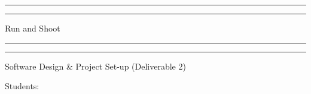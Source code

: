
 

\begin{titlepage} %

	\centering %
	
	\scshape %
	
	\vspace*{\baselineskip} %
	
	
	\rule{\textwidth}{1.6pt}\vspace*{-\baselineskip}\vspace*{2pt} %
	\rule{\textwidth}{0.4pt} %
	
	\vspace{0.75\baselineskip} %
	
	{\LARGE Run and Shoot} %
	
	\vspace{0.75\baselineskip} %
	
	\rule{\textwidth}{0.4pt}\vspace*{-\baselineskip}\vspace{3.2pt} %
	\rule{\textwidth}{1.6pt} %
	
	\vspace{2\baselineskip} %
	
	
	Software Design \& Project Set-up (Deliverable 2) %
	
	\vspace*{3\baselineskip} %
	
	
	Students:
	
	\vspace{0.5\baselineskip} %
	

\end{titlepage}
